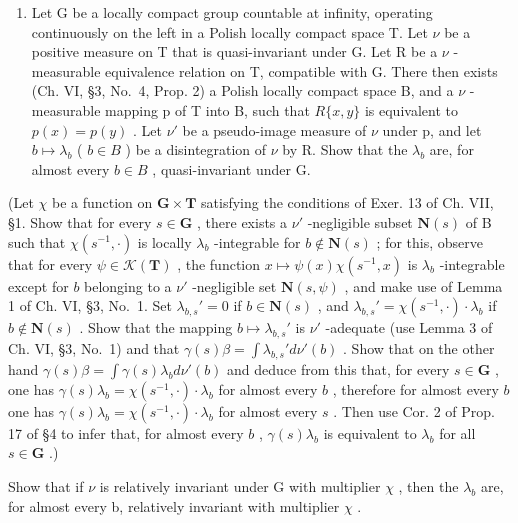 \begin{enumerate}
\def\labelenumi{\arabic{enumi})}
\setcounter{enumi}{7}
\tightlist
\item
  Let G be a locally compact group countable at infinity, operating continuously on the left in a Polish locally compact space T. Let \(\nu\) be a positive measure on T that is quasi-invariant under G. Let R be a \(\nu\) -measurable equivalence relation on T, compatible with G. There then exists (Ch. VI, §3, No.~4, Prop. 2) a Polish locally compact space B, and a \(\nu\) -measurable mapping p of T into B, such that \(R\{x,y\}\) is equivalent to \(p(x)=p(y)\) . Let \(\nu'\) be a pseudo-image measure of \(\nu\) under p, and let \(b\mapsto\lambda_{b}\) ( \(b\in B\) ) be a disintegration of \(\nu\) by R. Show that the \(\lambda_{b}\) are, for almost every \(b\in B\) , quasi-invariant under G.
\end{enumerate}

(Let \(\chi\) be a function on \(\mathbf{G} \times \mathbf{T}\) satisfying the conditions of Exer. 13 of Ch. VII, §1. Show that for every \(s \in \mathbf{G}\) , there exists a \(\nu'\) -negligible subset \(\mathbf{N}(s)\) of B such that \(\chi(s^{-1}, \cdot)\) is locally \(\lambda_b\) -integrable for \(b \notin \mathbf{N}(s)\) ; for this, observe that for every \(\psi \in \mathcal{K}(\mathbf{T})\) , the function \(x \mapsto \psi(x)\chi(s^{-1}, x)\) is \(\lambda_b\) -integrable except for \(b\) belonging to a \(\nu'\) -negligible set \(\mathbf{N}(s, \psi)\) , and make use of Lemma 1 of Ch. VI, §3, No.~1. Set \(\lambda_{b,s}' = 0\) if \(b \in \mathbf{N}(s)\) , and \(\lambda_{b,s}' = \chi(s^{-1}, \cdot) \cdot \lambda_b\) if \(b \notin \mathbf{N}(s)\) . Show that the mapping \(b \mapsto \lambda_{b,s}'\) is \(\nu'\) -adequate (use Lemma 3 of Ch. VI, §3, No.~1) and that \(\gamma(s)\beta = \int \lambda_{b,s}' d\nu'(b)\) . Show that on the other hand \(\gamma(s)\beta = \int \gamma(s)\lambda_b d\nu'(b)\) and deduce from this that, for every \(s \in \mathbf{G}\) , one has \(\gamma(s)\lambda_b = \chi(s^{-1}, \cdot) \cdot \lambda_b\) for almost every \(b\) , therefore for almost every \(b\) one has \(\gamma(s)\lambda_b = \chi(s^{-1}, \cdot) \cdot \lambda_b\) for almost every \(s\) . Then use Cor. 2 of Prop. 17 of §4 to infer that, for almost every \(b\) , \(\gamma(s)\lambda_b\) is equivalent to \(\lambda_b\) for all \(s \in \mathbf{G}\) .)

Show that if \(\nu\) is relatively invariant under G with multiplier \(\chi\) , then the \(\lambda_{b}\) are, for almost every b, relatively invariant with multiplier \(\chi\) .

